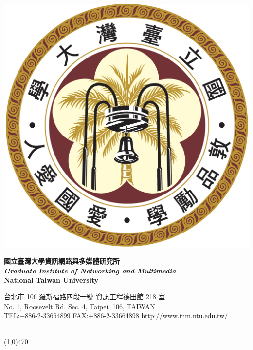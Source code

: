 \documentclass[12pt,letterpaper]{article}
\begin{document}
\begin{center}
\begin{minipage}{0.12\textwidth}
\includegraphics[width=\linewidth]{ntu_logo}
\end{minipage}
\hspace{1em}
\begin{minipage}{0.55\textwidth}
\textbf{國立臺灣大學資訊網路與多媒體研究所}\\
\textbf{\textit{Graduate Institute of Networking and Multimedia}}\\
\textbf{National Taiwan University}\\
\vspace{-1.2em}
\begin{spacing}{0.75}
{\footnotesize
台北市 106 羅斯福路四段一號 資訊工程德田館 218 室\\
No. 1, Roosevelt Rd. Sec. 4, Taipei, 106, TAIWAN\\
TEL:+886-2-33664899 FAX:+886-2-33664898
http://www.inm.ntu.edu.tw/
}
\end{spacing}
\end{minipage}
\\ \vspace{-5pt}\linethickness{0.5mm}\line(1,0){470}
\end{center}
\end{document}
